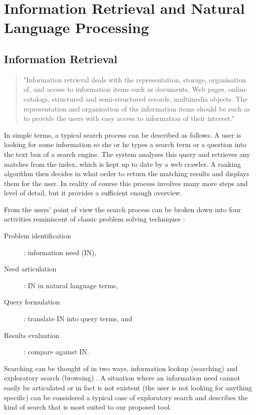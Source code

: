 
\chapter{Information Retrieval and Natural Language Processing}
\label{ch:irnlp}

\section{Information Retrieval}

\begin{quote}
  "Information retrieval deals with the representation, storage, organisation of, and access to information items such as documents, Web pages, online catalogs, structured and semi-structured records, multimedia objects. The representation and organisation of the information items should be such as to provide the users with easy access to information of their interest." \citep{Baeza-Yates2011}
\end{quote}

In simple terms, a typical search process can be described as follows. A user is looking for some information so she or he types a search term or a question into the text box of a search engine. The system analyses this query and retrieves any matches from the index, which is kept up to date by a web crawler. A ranking algorithm then decides in what order to return the matching results and displays them for the user. In reality of course this process involves many more steps and level of detail, but it provides a sufficient enough overview.

From the users' point of view the search process can be broken down into four activities \citep{Sutcliffe1998} reminiscent of classic problem solving techniques \citep{Polya1957}:

\begin{description}
  \item [Problem identification]: information need (IN),
  \item [Need articulation]: IN in natural language terms,
  \item [Query formulation]: translate IN into query terms, and
  \item [Results evaluation]: compare against IN.
\end{description}

Searching can be thought of in two ways, information lookup (searching) and exploratory search (browsing) \citep{DeVries1993,Marchionini2006}. A situation where an information need cannot easily be articulated or in fact is not existent (the user is not looking for anything specific) can be considered a typical case of exploratory search and describes the kind of search that is most suited to our proposed tool.

